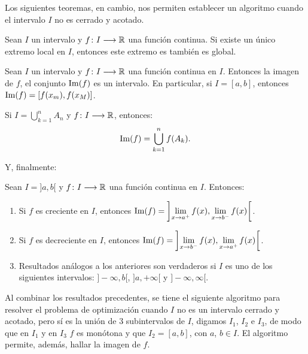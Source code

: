 Los siguientes teoremas, en cambio, nos permiten establecer un algoritmo cuando el intervalo $I$ no
es cerrado y acotado.

\begin{teocal}
Sean $I$ un intervalo y $\funcjc{f}{I}{\mathbb{R}}$ una función continua. Si existe un único extremo local en $I$, entonces este extremo es también es global.
\end{teocal}

\begin{teocal}
Sean $I$ un intervalo y $\funcjc{f}{I}{\Rbb}$ una función continua en $I$. Entonces la imagen de
$f$, el conjunto $\Img(f)$ es un intervalo. En particular, si $I=[a,b]$, entonces $\Img(f) =
[f(x_m),f(x_M)]$.
\end{teocal}

\begin{teocal}
Si $\displaystyle I = \bigcup_{k=1}^n A_n$ y $\funcjc{f}{I}{\Rbb}$, entonces:
\[
\Img(f) = \bigcup_{k=1}^n f(A_k).
\]
\end{teocal}

Y, finalmente:

\begin{teocal}
Sean $I = ]a,b[$ y $\funcjc{f}{I}{\Rbb}$ una función continua en $I$. Entonces:
\begin{enumerate}
\item Si $f$ es creciente en $I$, entonces $\displaystyle \Img(f) =
    \left]\limjc{f(x)}{x}{a^+},\limjc{f(x)}{x}{b^-}\right[$.

\item Si $f$ es decreciente en $I$, entonces $\displaystyle \Img(f) =
    \left]\limjc{f(x)}{x}{b^-},\limjc{f(x)}{x}{a^+}\right[$.

\item Resultados análogos a los anteriores son verdaderos si $I$ es uno de los siguientes
    intervalos: $]-\infty,b[$, $]a,+\infty[$ y $]-\infty,\infty[$.
\end{enumerate}
\end{teocal}

Al combinar los resultados precedentes, se tiene el siguiente algoritmo para resolver el problema
de optimización cuando $I$ no es un intervalo cerrado y acotado, pero sí es la unión de $3$ subintervalos de $I$, digamos $I_1$, $I_2$ e $I_3$, de modo que en $I_1$ y en $I_3$ $f$ es monótona y que $I_2=[a,b]$, con $a$, $b\in I$. El
algoritmo permite, además, hallar la imagen de $f$.

